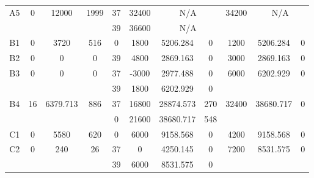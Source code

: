 \begin{sidewaystable}
\begin{tabular}{c||c|c|c||c|c|c|c||c|c|c}
         &
        
      \\
      \hline
      \multirow{2}{*}{A5} &
      \multirow{2}{*}{0} &
      \multirow{2}{*}{12000} &
      \multirow{2}{*}{1999} &
      37 &
      32400 &
        \multicolumn{2}{|c||}{N/A} &
      \multirow{2}{*}{34200} &
        \multicolumn{2}{c}{\multirow{2}{*}{N/A}}
      \\
      \cline{5-8}
       &
       &
       &
       &
      39 &
      36600 &
        \multicolumn{2}{|c||}{N/A} &
      
        
      \\
      \hline
      \multirow{1}{*}{B1} &
      \multirow{1}{*}{0} &
      \multirow{1}{*}{3720} &
      \multirow{1}{*}{516} &
      0 &
      1800 &
        5206.284 &
        0 &
      \multirow{1}{*}{1200} &
        \multirow{1}{*}{5206.284} &
        \multirow{1}{*}{0}
      \\
      \hline
      \multirow{1}{*}{B2} &
      \multirow{1}{*}{0} &
      \multirow{1}{*}{0} &
      \multirow{1}{*}{0} &
      39 &
      4800 &
        2869.163 &
        0 &
      \multirow{1}{*}{3000} &
        \multirow{1}{*}{2869.163} &
        \multirow{1}{*}{0}
      \\
      \hline
      \multirow{2}{*}{B3} &
      \multirow{2}{*}{0} &
      \multirow{2}{*}{0} &
      \multirow{2}{*}{0} &
      37 &
      -3000 &
        2977.488 &
        0 &
      \multirow{2}{*}{6000} &
        \multirow{2}{*}{6202.929} &
        \multirow{2}{*}{0}
      \\
      \cline{5-8}
       &
       &
       &
       &
      39 &
      1800 &
        6202.929 &
        0 &
      
         &
        
      \\
      \hline
      \multirow{2}{*}{B4} &
      \multirow{2}{*}{16} &
      \multirow{2}{*}{6379.713} &
      \multirow{2}{*}{886} &
      37 &
      16800 &
        28874.573 &
        270 &
      \multirow{2}{*}{32400} &
        \multirow{2}{*}{38680.717} &
        \multirow{2}{*}{0}
      \\
      \cline{5-8}
       &
       &
       &
       &
      0 &
      21600 &
        38680.717 &
        548 &
      
         &
        
      \\
      \hline
      \multirow{1}{*}{C1} &
      \multirow{1}{*}{0} &
      \multirow{1}{*}{5580} &
      \multirow{1}{*}{620} &
      0 &
      6000 &
        9158.568 &
        0 &
      \multirow{1}{*}{4200} &
        \multirow{1}{*}{9158.568} &
        \multirow{1}{*}{0}
      \\
      \hline
      \multirow{2}{*}{C2} &
      \multirow{2}{*}{0} &
      \multirow{2}{*}{240} &
      \multirow{2}{*}{26} &
      37 &
      0 &
        4250.145 &
        0 &
      \multirow{2}{*}{7200} &
        \multirow{2}{*}{8531.575} &
        \multirow{2}{*}{0}
      \\
      \cline{5-8}
       &
       &
       &
       &
      39 &
      6000 &
        8531.575 &
        0 &
      

\end{tabular}
\end{sidewaystable}
